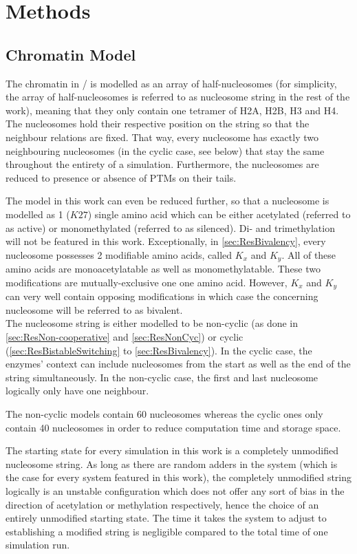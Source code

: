 \chapter{Methods}
    \label{cha:methods}
    \section{Chromatin Model}
    \label{sec:ChromatinModel}
        The chromatin in \ed/ is modelled as an array of half-nucleosomes (for simplicity, the array of half-nucleosomes  is referred to as nucleosome string in the rest of the work), meaning that they only contain one tetramer of H2A, H2B, H3 and H4. The nucleosomes hold their respective position on the string so that the neighbour relations are fixed. That way, every nucleosome has exactly two neighbouring nucleosomes (in the cyclic case, see below) that stay the same throughout the entirety of a simulation. Furthermore, the nucleosomes are reduced to presence or absence of PTMs on their tails.

        The model in this work can even be reduced further, so that a nucleosome is modelled as 1 ($K27$) single amino acid which can be either acetylated (referred to as active) or monomethylated (referred to as silenced). Di- and trimethylation will not be featured in this work. Exceptionally, in \ref{sec:ResBivalency}, every nucleosome possesses 2 modifiable amino acids, called $K_x$ and $K_y$. All of these amino acids are monoacetylatable as well as monomethylatable. These two modifications are mutually-exclusive one one amino acid. However, $K_x$ and $K_y$ can very well contain opposing modifications in which case the concerning nucleosome will be referred to as bivalent.\\

        The nucleosome string is either modelled to be non-cyclic (as done in \ref{sec:ResNon-cooperative} and \ref{sec:ResNonCyc}) or cyclic (\ref{sec:ResBistableSwitching} to \ref{sec:ResBivalency}). In the cyclic case, the enzymes' context can include nucleosomes from the start as well as the end of the string simultaneously. In the non-cyclic case, the first and last nucleosome logically only have one neighbour.

        The non-cyclic models contain 60 nucleosomes whereas the cyclic ones only contain 40 nucleosomes in order to reduce computation time and storage space.

        The starting state for every simulation in this work is a completely unmodified nucleosome string. As long as there are random adders in the system (which is the case for every system featured in this work), the completely unmodified string logically is an unstable configuration which does not offer any sort of bias in the direction of acetylation or methylation respectively, hence the choice of an entirely unmodified starting state. The time it takes the system to adjust to establishing a modified string is negligible compared to the total time of one simulation run.
